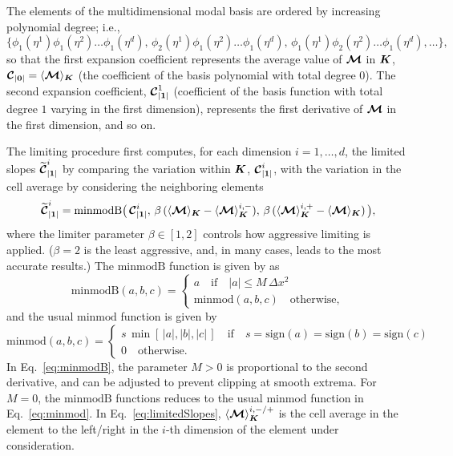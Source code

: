 \documentclass[10pt,preprint]{aastex}
\begin{document}
The elements of the multidimensional modal basis are ordered by increasing polynomial degree; i.e., 
\begin{equation}
  \{\phi_{1}(\eta^{1})\phi_{1}(\eta^{2})\ldots\phi_{1}(\eta^{d}),\,\phi_{2}(\eta^{1})\phi_{1}(\eta^{2})\ldots\phi_{1}(\eta^{d}),\,\phi_{1}(\eta^{1})\phi_{2}(\eta^{2})\ldots\phi_{1}(\eta^{d}),\ldots\},
\end{equation}
so that the first expansion coefficient represents the average value of $\boldsymbol{\mathcal{M}}$ in $\boldsymbol{K}$, $\boldsymbol{\mathcal{C}}_{|\boldsymbol{0}|}=\langle\boldsymbol{\mathcal{M}}\rangle_{\boldsymbol{K}}$ (the coefficient of the basis polynomial with total degree $0$).  
The second expansion coefficient, $\boldsymbol{\mathcal{C}}_{|\boldsymbol{1}|}^{1}$ (coefficient of the basis function with total degree $1$ varying in the first dimension), represents the first derivative of $\boldsymbol{\mathcal{M}}$ in the first dimension, and so on.  

The limiting procedure first computes, for each dimension $i=1,\ldots,d$, the limited slopes $\widetilde{\boldsymbol{\mathcal{C}}}_{|\boldsymbol{1}|}^{i}$ by comparing the variation within $\boldsymbol{K}$, $\boldsymbol{\mathcal{C}}_{|\boldsymbol{1}|}^{i}$, with the variation in the cell average by considering the neighboring elements
\begin{equation}
  \widetilde{\boldsymbol{\mathcal{C}}}_{|\boldsymbol{1}|}^{i}
  =\text{minmodB}
  \big(\,
    \boldsymbol{\mathcal{C}}_{|\boldsymbol{1}|}^{i},\,
    \beta\,(\langle\boldsymbol{\mathcal{M}}\rangle_{\boldsymbol{K}}-\langle\boldsymbol{\mathcal{M}}\rangle_{\boldsymbol{K}}^{i,-}),\,
    \beta\,(\langle\boldsymbol{\mathcal{M}}\rangle_{\boldsymbol{K}}^{i,+}-\langle\boldsymbol{\mathcal{M}}\rangle_{\boldsymbol{K}})
  \,\big),
  \label{eq:limitedSlopes}
\end{equation}
where the limiter parameter $\beta\in[1,2]$ controls how aggressive limiting is applied.  
($\beta=2$ is the least aggressive, and, in many cases, leads to the most accurate results.)  
The $\text{minmodB}$ function is given by \citet{cockburnShu_2001} as
\begin{equation}
  \mbox{minmodB}(a,b,c)
  =\left\{\begin{array}{ll}
  a \quad\text{if}\quad |a|\le M\,\Delta x^{2} \\
  \mbox{minmod}(a,b,c) \quad \text{otherwise},
  \end{array}\right.
  \label{eq:minmodB}
\end{equation}
and the usual $\text{minmod}$ function is given by
\begin{equation}
  \mbox{minmod}(a,b,c)
  =\left\{\begin{array}{ll}
  s\,\min[\,|a|,|b|,|c|\,] \quad\text{if}\quad s=\mbox{sign}(a)=\mbox{sign}(b)=\mbox{sign}(c) \\
  0 \quad \text{otherwise}.
  \end{array}\right.
  \label{eq:minmod}
\end{equation}
In Eq.~\eqref{eq:minmodB}, the parameter $M>0$ is proportional to the second derivative, and can be adjusted to prevent clipping at smooth extrema.  
For $M=0$, the $\text{minmodB}$ functions reduces to the usual minmod function in Eq.~\eqref{eq:minmod}.  
In Eq.~\eqref{eq:limitedSlopes}, $\langle\boldsymbol{\mathcal{M}}\rangle_{\boldsymbol{K}}^{i,-/+}$ is the cell average in the element to the left/right in the $i$-th dimension of the element under consideration.  
\end{document}
